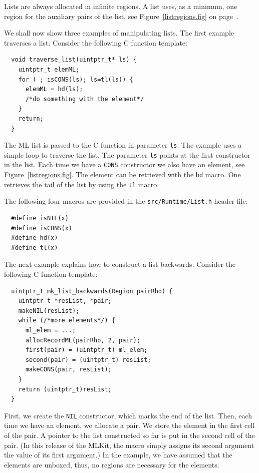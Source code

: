 \documentclass[12pt]{book}
\begin{document}
Lists are always allocated in infinite regions. A list uses, as a minimum,
one region for the auxiliary pairs of the list, see Figure~\ref{listregions.fig} on page~\pageref{listregions.fig}.

We shall now show three examples of manipulating lists. The first example
traverses a list. Consider the following C function template:
%
\begin{verbatim}
  void traverse_list(uintptr_t* ls) {
    uintptr_t elemML;
    for ( ; isCONS(ls); ls=tl(ls)) {
      elemML = hd(ls);
      /*do something with the element*/
    }
    return;
  }
\end{verbatim}

The ML list is passed to the C function in parameter \texttt{ls}.
The example uses a simple loop to traverse the list. The parameter
\texttt{ls} points at the first constructor in the list. Each time
we have a \texttt{CONS} constructor we also have an element, see
Figure~\ref{listregions.fig}. The element can be retrieved with the
\texttt{hd} macro.  One retrieves the tail of the list by using the
\texttt{tl} macro.

The following four macros are provided in the {\tt src/Runtime/List.h}
header file:
%
%
%
%
\begin{verbatim}
  #define isNIL(x)
  #define isCONS(x)
  #define hd(x)
  #define tl(x)
\end{verbatim}

The next example explains how to construct a list backwards. Consider
the following C function template:
%
\begin{verbatim}
  uintptr_t mk_list_backwards(Region pairRho) {
    uintptr_t *resList, *pair;
    makeNIL(resList);
    while (/*more elements*/) {
      ml_elem = ...;
      allocRecordML(pairRho, 2, pair);
      first(pair) = (uintptr_t) ml_elem;
      second(pair) = (uintptr_t) resList;
      makeCONS(pair, resList);
    }
    return (uintptr_t)resList;
  }
\end{verbatim}
First, we create the \texttt{NIL} constructor, which marks the end of
the list. Then, each time we have an element, we allocate a pair. We
store the element in the first cell of the pair. A pointer to the list
constructed so far is put in the second cell of the pair. (In this
release of the MLKit, the  macro simply assigns its
second argument the value of its first argument.) In the example, we
have assumed that the elements are unboxed, thus, no regions are
necessary for the elements.
\end{document}
